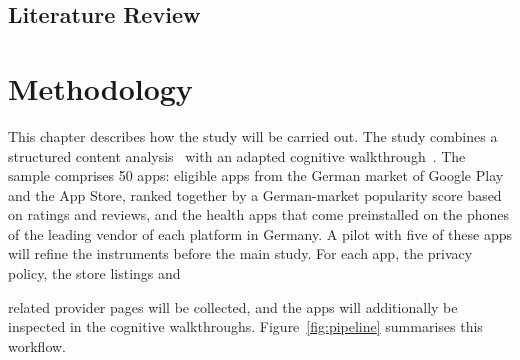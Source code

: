 \documentclass[twoside,its]{bossthesis}
\makeatletter
\newif\ifshowhighlights
\def\hl@ulpreamble{\SOUL@hlpreamble
  \hl@lnht=-\SOUL@uldp \advance\hl@lnht by \hl@lnthick}
\def\hl@ulleaders{\xleaders\hbox to 1pt{%
  \rlap{\vrule width 1.2pt height \SOUL@ulht depth \SOUL@uldp}%
  \rlap{\textcolor{todoline}{\vrule width 1.2pt height \hl@lnht depth \SOUL@uldp}}\hss}}
\DeclareRobustCommand*\texthlul{\SOUL@hlsetup
  \let\SOUL@preamble\hl@ulpreamble \let\SOUL@ulleaders\hl@ulleaders \SOUL@}
\newcommand{\hl@plain}[2]{{\sethlcolor{#1}\hl{#2}}}
\newcommand{\hl@marked}[2]{{\sethlcolor{#1}\texthlul{#2}}}
\newcommand{\hl@off}[2]{#2}
\newcommand{\hl@on}[2]{\@ifnextchar\todo{\hl@marked{#1}{#2}}{\hl@plain{#1}{#2}}}
\newcommand{\highlight}[2][yellow]{%
  \ifshowhighlights
    \expandafter\hl@on %
  \else
    \expandafter\hl@off
  \fi
  {#1}{#2}}
\makeatother
\begin{document}
\section{Literature Review}



\chapter{Methodology}
\label{ch:methodology}


This chapter describes how the study will be carried out. The study combines
a structured content analysis~\parencite{krippendorff2019content} with an
adapted cognitive walkthrough~\parencite{wharton1994cognitive}. The sample comprises 50
apps: eligible apps from the German market of Google Play and the App Store,
ranked together by a German-market popularity score based on ratings and reviews, and the health apps that
come preinstalled on the phones of the leading vendor of each platform in Germany. A pilot
with five of these apps will refine the instruments before the main study.
For each app, the privacy policy, the store listings and \highlight[orange!25]{related provider
pages} will be collected, and the apps will additionally be inspected in the cognitive walkthroughs.  Figure~\ref{fig:pipeline} summarises this workflow.
\end{document}

